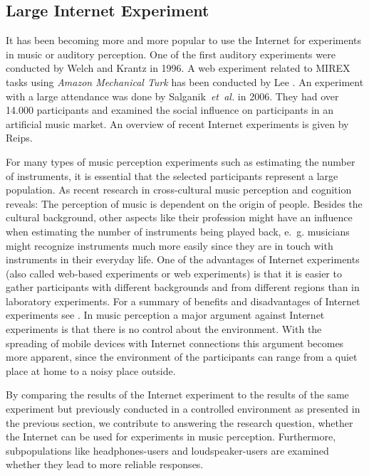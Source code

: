 \subsection{Large Internet Experiment}
It has been becoming more and more popular to use the Internet for experiments in music or auditory perception. One of the first auditory experiments were conducted by Welch and Krantz\cite{Welch1996} in 1996. A web experiment related to MIREX tasks using \emph{Amazon Mechanical Turk} has been conducted by Lee \cite{lee2010}. An experiment with a large attendance was done by Salganik~\textit{et~al.}\cite{Salganik2006} in 2006. They had over 14.000 participants and examined the social influence on participants in an artificial music market. An overview of recent Internet experiments is given by Reips\cite{Reips2012}.
\par
For many types of music perception experiments such as estimating the number of instruments, it is essential that the selected participants represent a large population. As recent research in cross-cultural music perception and cognition reveals: The perception of music is dependent on the origin of people\cite{stevens2012}. Besides the cultural background, other aspects like their profession might have an influence when estimating the number of instruments being played back, e.~g. musicians might recognize instruments much more easily since they are in touch with instruments in their everyday life. One of the advantages of Internet experiments (also called web-based experiments or web experiments) is that it is easier to gather participants with different backgrounds and from different regions than in laboratory experiments. For a summary of benefits and disadvantages of Internet experiments see \cite{Reips2002}. In music perception a major argument against Internet experiments is that there is no control about the environment. With the spreading of mobile devices with Internet connections this argument becomes more apparent, since the environment of the participants can range from a quiet place at home to a noisy place outside.
\par
By comparing the results of the Internet experiment to the results of the same experiment but previously conducted in a controlled environment as presented in the previous section, we contribute to answering the research question, whether the Internet can be used for experiments in music perception. 
Furthermore, subpopulations like headphones-users and loudspeaker-users are examined whether they lead to more reliable responses.
\par
